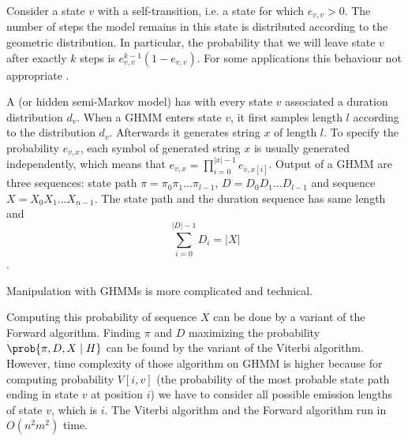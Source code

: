 Consider a state $v$ with a self-transition, i.e. a state for which $e_{v,v}>0$.
The number of steps the model remains in this state is distributed according to
the geometric distribution.
In particular, the probability that we will leave state $v$ after exactly $k$ steps is
$e_{v,v}^{k-1}(1-e_{v,v})$. For some
applications this behaviour not
appropriate \cite{Burge1997,Majoros2004}.

A  (or hidden semi-Markov model)
has with every state $v$ associated a duration distribution $d_v$.  When
a GHMM enters state $v$, it first samples length $l$ according
to the distribution $d_v$.  Afterwards it generates string $x$ of length $l$.  To
specify the probability $e_{v,x}$, each symbol of generated string $x$ is usually
generated independently, which means that $e_{v,x}=\prod_{i=0}^{|x|-1}e_{v,x[i]}$.
Output of a GHMM are three sequences: state path $\pi=\pi_0\pi_1\dots\pi_{l-1}$,
 $D=D_0D_1\dots D_{l-1}$ and sequence
$X=X_0X_1\dots X_{n-1}$.  The state path and the duration sequence has same
length and \[\sum_{i=0}^{|D|-1}D_i = |X|\].

Manipulation with GHMMs is  more complicated and technical.

Computing this probability of sequence $X$ can be done by a variant of the
Forward algorithm. Finding $\pi$ and $D$ maximizing the probability
$\prob{\pi,D,X\mid H}$ can be found by the variant of the Viterbi algorithm.
However, time complexity of those algorithm on GHMM is higher because for
computing probability $V[i, v]$ (the probability of the most probable state
path ending in state $v$ at position $i$) we have to consider all possible
emission lengths of state $v$, which is $i$. The Viterbi algorithm and the
Forward algorithm run in $O(n^2m^2)$ time.



